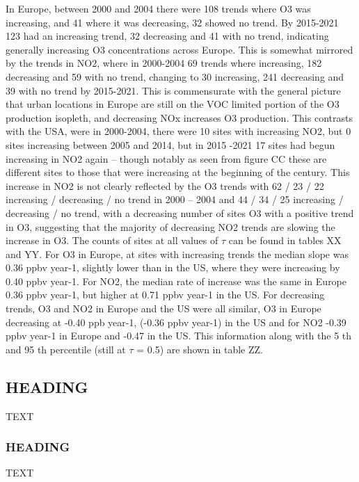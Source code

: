 \documentclass[journal abbreviation, manuscript]{copernicus}
\begin{document}
In Europe, between 2000 and 2004 there were 108 trends where O3 was increasing, and 41 where it was decreasing, 32 showed no trend. By 2015-2021 123 had an increasing trend, 32 decreasing and 41 with no trend, indicating generally increasing O3 concentrations across Europe. This is somewhat mirrored by the trends in NO2, where in 2000-2004 69 trends where increasing, 182 decreasing and 59 with no trend, changing to 30 increasing, 241 decreasing and 39 with no trend by 2015-2021. This is commensurate with the general picture that urban locations in Europe are still on the VOC limited portion of the O3 production isopleth, and decreasing NOx increases O3 production. 
This contrasts with the USA, were in 2000-2004, there were 10 sites with increasing NO2, but 0 sites increasing between 2005 and 2014, but in 2015 -2021 17 sites had begun increasing in NO2 again – though notably as seen from figure CC these are different sites to those that were increasing at the beginning of the century. This increase in NO2 is not clearly reflected by the O3 trends with 62 / 23 / 22 increasing / decreasing / no trend in 2000 – 2004 and 44 / 34 / 25 increasing / decreasing / no trend, with a decreasing number of sites O3 with a positive trend in O3, suggesting that the majority of decreasing NO2 trends are slowing the increase in O3. The counts of sites at all values of $\tau$ can be found in tables XX and YY. 
For O3 in Europe, at sites with increasing trends the median slope was 0.36 ppbv year-1, slightly lower than in the US, where they were increasing by 0.40 ppbv year-1. For NO2, the median rate of increase was the same in Europe 0.36 ppbv year-1, but higher at 0.71 ppbv year-1 in the US. For decreasing trends, O3 and NO2 in Europe and the US were all similar, O3 in Europe decreasing at -0.40 ppb year-1, (-0.36 ppbv year-1) in the US and for NO2 -0.39 ppbv year-1 in Europe and -0.47 in the US. This information along with the 5 th and 95 th percentile (still at $\tau$ = 0.5) are shown in table ZZ. 










\subsection{HEADING}
TEXT


\subsubsection{HEADING}
TEXT
\end{document}
